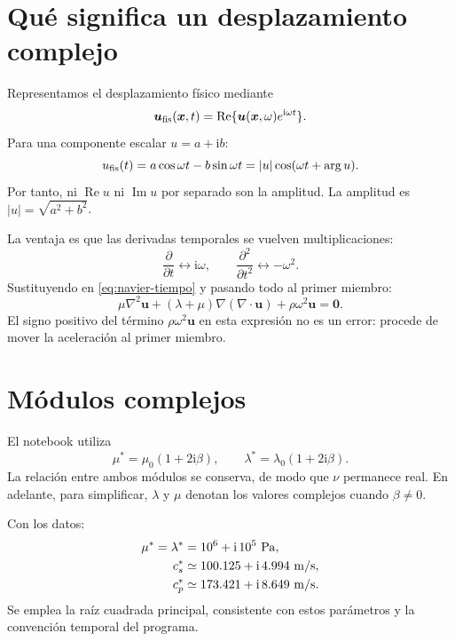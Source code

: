 \documentclass[11pt,a4paper]{report}
\numberwithin{equation}{chapter}
\newcommand{\vect}[1]{\bm{#1}}
\newcommand{\ii}{\mathrm{i}}
\begin{document}
\section{Qu\'e significa un desplazamiento complejo}
Representamos el desplazamiento f\'isico mediante
\begin{equation}
  \vect u_{\rm fis}(\vect x,t)
   =\operatorname{Re}\{\vect u(\vect x,\omega)e^{\ii\omega t}\}.
\end{equation}
Para una componente escalar $u=a+\ii b$:
\begin{equation}
 u_{\rm fis}(t)=a\cos\omega t-b\sin\omega t
              =|u|\cos(\omega t+\arg u).
\end{equation}
Por tanto, ni $\operatorname{Re}u$ ni $\operatorname{Im}u$ por separado son
la amplitud. La amplitud es $|u|=\sqrt{a^2+b^2}$.

La ventaja es que las derivadas temporales se vuelven multiplicaciones:
\begin{equation}
  \frac{\partial}{\partial t}\longleftrightarrow\ii\omega,\qquad
  \frac{\partial^2}{\partial t^2}\longleftrightarrow-\omega^2.
\end{equation}
Sustituyendo en \eqref{eq:navier-tiempo} y pasando todo al primer miembro:
\begin{equation}
 \boxed{\mu\nabla^2\vect u+
  (\lambda+\mu)\nabla(\nabla\cdot\vect u)+\rho\omega^2\vect u=\vect0.}
 \label{eq:navier-armonica}
\end{equation}
El signo positivo del t\'ermino $\rho\omega^2\vect u$ en esta expresi\'on
no es un error: procede de mover la aceleraci\'on al primer miembro.

\section{M\'odulos complejos}
El notebook utiliza
\begin{equation}
  \mu^*=\mu_0(1+2\ii\beta),\qquad
  \lambda^*=\lambda_0(1+2\ii\beta).
  \label{eq:modulos-complejos}
\end{equation}
La relaci\'on entre ambos m\'odulos se conserva, de modo que $\nu$
permanece real. En adelante, para simplificar, $\lambda$ y $\mu$
denotan los valores complejos cuando $\beta\ne0$.

Con los datos:
\begin{align}
 \mu^*=\lambda^*&=10^6+\ii\,10^5\ {\rm Pa},\\
 c_s^*&\simeq100.125+\ii\,4.994\ {\rm m/s},\\
 c_p^*&\simeq173.421+\ii\,8.649\ {\rm m/s}.
\end{align}
Se emplea la ra\'iz cuadrada principal, consistente con estos par\'ametros
y la convenci\'on temporal del programa.
\end{document}
